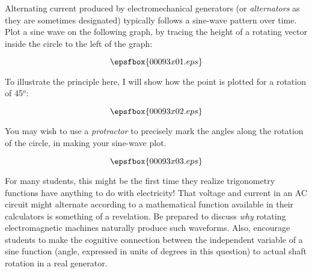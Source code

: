 

Alternating current produced by electromechanical generators (or {\it alternators} as they are sometimes designated) typically follows a sine-wave pattern over time.  Plot a sine wave on the following graph, by tracing the height of a rotating vector inside the circle to the left of the graph:

$$\epsfbox{00093x01.eps}$$

To illustrate the principle here, I will show how the point is plotted for a rotation of 45$^{o}$:

$$\epsfbox{00093x02.eps}$$

You may wish to use a {\it protractor} to precisely mark the angles along the rotation of the circle, in making your sine-wave plot.







$$\epsfbox{00093x03.eps}$$







For many students, this might be the first time they realize trigonometry functions have anything to do with electricity!  That voltage and current in an AC circuit might alternate according to a mathematical function available in their calculators is something of a revelation.  Be prepared to discuss {\it why} rotating electromagnetic machines naturally produce such waveforms.  Also, encourage students to make the cognitive connection between the independent variable of a sine function (angle, expressed in units of degrees in this question) to actual shaft rotation in a real generator.




